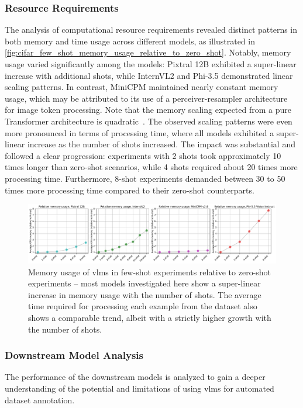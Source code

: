 \documentclass[../ShajiS_RnDReport.tex]{subfiles}
\begin{document}
\subsubsection{Resource Requirements}
The analysis of computational resource requirements revealed distinct patterns in both memory and time usage across different models, as illustrated in \autoref{fig:cifar_few_shot_memory_usage_relative_to_zero_shot}. Notably, memory usage varied significantly among the models: Pixtral 12B exhibited a super-linear increase with additional shots, while InternVL2 and Phi-3.5 demonstrated linear scaling patterns. In contrast, MiniCPM maintained nearly constant memory usage, which may be attributed to its use of a perceiver-resampler architecture for image token processing. Note that the memory scaling expected from a pure Transformer architecture is quadratic~\cite{Vaswani2017}. The observed scaling patterns were even more pronounced in terms of processing time, where all models exhibited a super-linear increase as the number of shots increased. The impact was substantial and followed a clear progression: experiments with 2 shots took approximately 10 times longer than zero-shot scenarios, while 4 shots required about 20 times more processing time. Furthermore, 8-shot experiments demanded between 30 to 50 times more processing time compared to their zero-shot counterparts.

\begin{figure}[ht]
    \centering
    \includegraphics[width=\linewidth]{figures/cifar_few_shot_memory_usage_relative_to_zero_shot.pdf}
    \caption{Memory usage of \glspl{vlm} in few-shot experiments relative to zero-shot experiments -- most models investigated here show a super-linear increase in memory usage with the number of shots. The average time required for processing each example from the dataset also shows a comparable trend, albeit with a strictly higher growth with the number of shots.}
    \label{fig:cifar_few_shot_memory_usage_relative_to_zero_shot}
\end{figure}

\subsubsection{Downstream Model Analysis}
The performance of the downstream models is analyzed to gain a deeper understanding of the potential and limitations of using \glspl{vlm} for automated dataset annotation.
\end{document}

